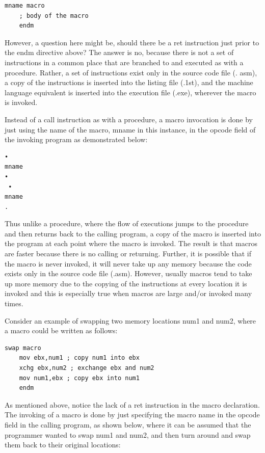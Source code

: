 \documentclass[10pt]{article}
\begin{document}
\begin{verbatim}
mname macro
    ; body of the macro
    endm
\end{verbatim}

However, a question here might be, should there be a ret instruction just prior to the endm directive above? The answer is no, because there is not a set of instructions in a common place that are branched to and executed as with a procedure. Rather, a set of instructions exist only in the source code file (. asm), a copy of the instructions is inserted into the listing file (.1st), and the machine language equivalent is inserted into the execution file (.exe), wherever the macro is invoked.

Instead of a call instruction as with a procedure, a macro invocation is done by just using the name of the macro, mname in this instance, in the opcode field of the invoking program as demonstrated below:

\begin{verbatim}
•
mname
•
 •
mname
.
\end{verbatim}

Thus unlike a procedure, where the flow of executions jumps to the procedure and then returns back to the calling program, a copy of the macro is inserted into the program at each point where the macro is invoked. The result is that macros are faster because there is no calling or returning. Further, it is possible that if the macro is never invoked, it will never take up any memory because the code exists only in the source code file (.asm). However, usually macros tend to take up more memory due to the copying of the instructions at every location it is invoked and this is especially true when macros are large and/or invoked many times.

Consider an example of swapping two memory locations num1 and num2, where a macro could be written as follows:

\begin{verbatim}
swap macro
    mov ebx,num1 ; copy num1 into ebx
    xchg ebx,num2 ; exchange ebx and num2
    mov num1,ebx ; copy ebx into num1
    endm
\end{verbatim}

As mentioned above, notice the lack of a ret instruction in the macro declaration. The invoking of a macro is done by just specifying the macro name in the opcode field in the calling program, as shown below, where it can be assumed that the programmer wanted to swap num1 and num2, and then turn around and swap them back to their original locations:
\end{document}
